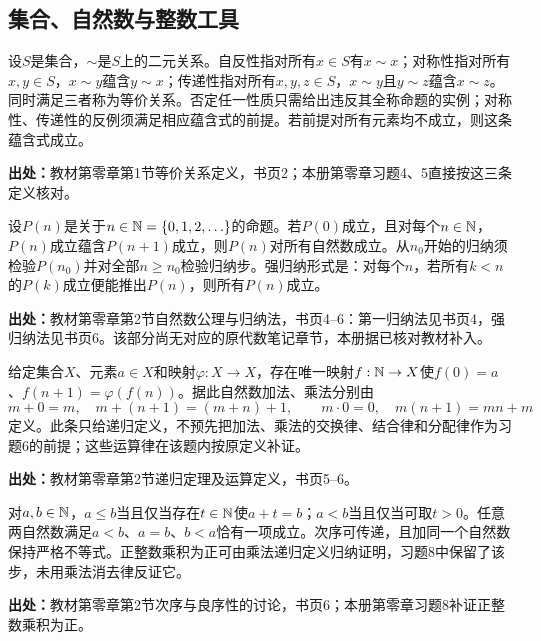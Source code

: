 \subsection{集合、自然数与整数工具}

\begin{reviewdefinition}\label{tool:n-relations}
设$S$是集合，$\sim$是$S$上的二元关系。自反性指对所有$x\in S$有$x\sim x$；对称性指对所有$x,y\in S$，$x\sim y$蕴含$y\sim x$；传递性指对所有$x,y,z\in S$，$x\sim y$且$y\sim z$蕴含$x\sim z$。同时满足三者称为等价关系。否定任一性质只需给出违反其全称命题的实例；对称性、传递性的反例须满足相应蕴含式的前提。若前提对所有元素均不成立，则这条蕴含式成立。

\textbf{出处：}教材第零章第1节等价关系定义，书页2；本册第零章习题4、5直接按这三条定义核对。
\end{reviewdefinition}

\begin{reviewtheorem}[数学归纳法]\label{tool:n-induction}
设$P(n)$是关于$n\in\mathbb N=\{0,1,2,\ldots\}$的命题。若$P(0)$成立，且对每个$n\in\mathbb N$，$P(n)$成立蕴含$P(n+1)$成立，则$P(n)$对所有自然数成立。从$n_0$开始的归纳须检验$P(n_0)$并对全部$n\ge n_0$检验归纳步。强归纳形式是：对每个$n$，若所有$k<n$的$P(k)$成立便能推出$P(n)$，则所有$P(n)$成立。

\textbf{出处：}教材第零章第2节自然数公理与归纳法，书页4--6：第一归纳法见书页4，强归纳法见书页6。该部分尚无对应的原代数笔记章节，本册据已核对教材补入。
\end{reviewtheorem}

\begin{reviewtheorem}[自然数递归构造]\label{tool:n-recursion}
给定集合$X$、元素$a\in X$和映射$\varphi:X\to X$，存在唯一映射$f:\mathbb N\to X$使$f(0)=a$、$f(n+1)=\varphi(f(n))$。据此自然数加法、乘法分别由
\[
m+0=m,\quad m+(n+1)=(m+n)+1,\qquad
m\cdot0=0,\quad m(n+1)=mn+m
\]
定义。此条只给递归定义，不预先把加法、乘法的交换律、结合律和分配律作为习题6的前提；这些运算律在该题内按原定义补证。

\textbf{出处：}教材第零章第2节递归定理及运算定义，书页5--6。
\end{reviewtheorem}

\begin{reviewprop}[自然数的次序]\label{tool:n-order}
对$a,b\in\mathbb N$，$a\le b$当且仅当存在$t\in\mathbb N$使$a+t=b$；$a<b$当且仅当可取$t>0$。任意两自然数满足$a<b$、$a=b$、$b<a$恰有一项成立。次序可传递，且加同一个自然数保持严格不等式。正整数乘积为正可由乘法递归定义归纳证明，习题8中保留了该步，未用乘法消去律反证它。

\textbf{出处：}教材第零章第2节次序与良序性的讨论，书页6；本册第零章习题8补证正整数乘积为正。
\end{reviewprop}

